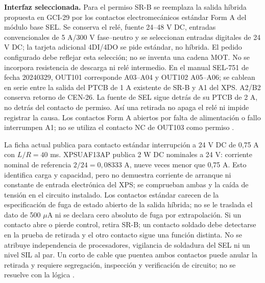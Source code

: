 \textbf{Interfaz seleccionada.} Para el permiso SR-B se reemplaza la salida híbrida propuesta en GCI-29 por los contactos electromecánicos estándar Form A del módulo base SEL. Se conserva el relé, fuente 24--48 V DC, entradas convencionales de 5 A/300 V fase--neutro y se seleccionan entradas digitales de 24 V DC; la tarjeta adicional 4DI/4DO se pide estándar, no híbrida. El pedido configurado debe reflejar esta selección; no se inventa una cadena MOT. No se incorpora resistencia de descarga ni relé intermedio. En el manual SEL-751 de fecha 20240329, OUT101 corresponde A03--A04 y OUT102 A05--A06; se cablean en serie entre la salida del PTCB de 1 A existente de SR-B y A1 del XPS. A2/B2 conserva retorno de CEN-26. La fuente de SEL sigue detrás de su PTCB de 2 A, no detrás del contacto de permiso. Así una retirada no apaga el relé ni impide registrar la causa. Los contactos Form A abiertos por falta de alimentación o fallo interrumpen A1; no se utiliza el contacto NC de OUT103 como permiso \parencite[pp.~2.2--2.3, 2.28--2.31 y 4.200--4.201]{lote32-selmanual2024}.

La ficha actual publica para contacto estándar interrupción a 24 V DC de 0,75 A con $L/R=40$ ms. XPSUAF13AP publica 2 W DC nominales a 24 V: corriente nominal de referencia $2/24=0,08333$ A, nueve veces menor que 0,75 A. Esto identifica carga y capacidad, pero no demuestra corriente de arranque ni constante de entrada electrónica del XPS; se comprueban ambas y la caída de tensión en el circuito instalado. Los contactos estándar carecen de la especificación de fuga de estado abierto de la salida híbrida; no se le traslada el dato de 500 $\mu$A ni se declara cero absoluto de fuga por extrapolación. Si un contacto abre o pierde control, retira SR-B; un contacto soldado debe detectarse en la prueba de retirada y el otro contacto sigue una función distinta. No se atribuye independencia de procesadores, vigilancia de soldadura del SEL ni un nivel SIL al par. Un corto de cable que puentea ambos contactos puede anular la retirada y requiere segregación, inspección y verificación de circuito; no se resuelve con la lógica \parencites[p.~34]{lote29-sel751}[p.~21]{lote26-xpsmanual}.

